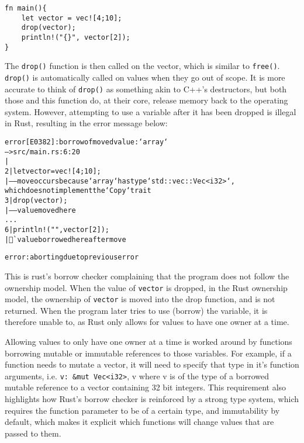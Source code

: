 \begin{code}
\begin{verbatim}
fn main(){
    let vector = vec![4;10];
    drop(vector);
    println!("{}", vector[2]);
}
\end{verbatim}
\label{lst:rust-free}
\end{code}

The \texttt{drop()} function is then called on the vector, which is similar to \texttt{free()}. \texttt{drop()} is automatically called on values when they go out of scope. It is more accurate to think of \texttt{drop()} as something akin to C++'s destructors, but both those and this function do, at their core, release memory back to the operating system. However, attempting to use a variable after it has been dropped is illegal in Rust, resulting in the error message below:

\begin{alltt}
\scriptsize
error[E0382]: borrow of moved value: `array`
 --> src/main.rs:6:20
  |
2 |     let vector = vec![4;10];
  |         ----- move occurs because `array` has type `std::vec::Vec<i32>`,
  which does not implement the `Copy` trait
3 |     drop(vector);
  |          ----- value moved here
...
6 |     println!("{}", vector[2]);
  |                    ^^^^^ value borrowed here after move

error: aborting due to previous error
\end{alltt}

This is rust's borrow checker complaining that the program does not follow the ownership model. When the value of \texttt{vector} is dropped, in the Rust ownership model, the ownership of \texttt{vector} is moved into the drop function, and is not returned. When the program later tries to use (borrow) the variable, it is therefore unable to, as Rust only allows for values to have one owner at a time.


Allowing values to only have one owner at a time is worked around by functions borrowing mutable or immutable references to those variables. For example, if a function needs to mutate a vector, it will need to specify that type in it's function arguments, i.e. \texttt{v: \&mut Vec<i32>}, v where v is of the type of a borrowed mutable reference to a vector containing 32 bit integers.
This requirement also highlights how Rust's borrow checker is reinforced by a strong type system, which requires the function parameter to be of a certain type, and immutability by default, which makes it explicit which functions will change values that are passed to them.

